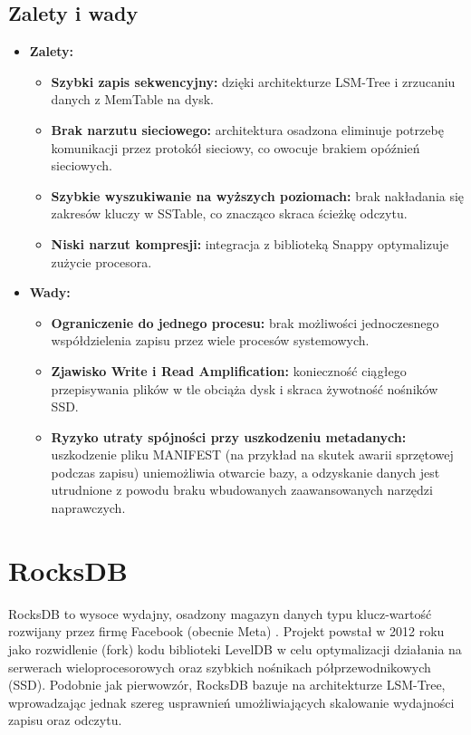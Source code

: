 \subsection{Zalety i wady}
\begin{itemize}
    \item \textbf{Zalety:}
    \begin{itemize}
        \item \textbf{Szybki zapis sekwencyjny:} dzięki architekturze LSM-Tree i zrzucaniu danych z MemTable na dysk.
        \item \textbf{Brak narzutu sieciowego:} architektura osadzona eliminuje potrzebę komunikacji przez protokół sieciowy, co owocuje brakiem opóźnień sieciowych.
        \item \textbf{Szybkie wyszukiwanie na wyższych poziomach:} brak nakładania się zakresów kluczy w SSTable, co znacząco skraca ścieżkę odczytu.
        \item \textbf{Niski narzut kompresji:} integracja z biblioteką Snappy optymalizuje zużycie procesora.
    \end{itemize}
    \item \textbf{Wady:}
    \begin{itemize}
        \item \textbf{Ograniczenie do jednego procesu:} brak możliwości jednoczesnego współdzielenia zapisu przez wiele procesów systemowych.
        \item \textbf{Zjawisko Write i Read Amplification:} konieczność ciągłego przepisywania plików w tle obciąża dysk i skraca żywotność nośników SSD.
        \item \textbf{Ryzyko utraty spójności przy uszkodzeniu metadanych:} uszkodzenie pliku MANIFEST (na przykład na skutek awarii sprzętowej podczas zapisu) uniemożliwia otwarcie bazy, a odzyskanie danych jest utrudnione z powodu braku wbudowanych zaawansowanych narzędzi naprawczych.
    \end{itemize}
\end{itemize}

\section{RocksDB}
RocksDB to wysoce wydajny, osadzony magazyn danych typu klucz-wartość rozwijany przez firmę Facebook (obecnie Meta) \cite{borthakur2013}. Projekt powstał w 2012 roku jako rozwidlenie (fork) kodu biblioteki LevelDB w celu optymalizacji działania na serwerach wieloprocesorowych oraz szybkich nośnikach półprzewodnikowych (SSD). Podobnie jak pierwowzór, RocksDB bazuje na architekturze LSM-Tree, wprowadzając jednak szereg usprawnień umożliwiających skalowanie wydajności zapisu oraz odczytu.


